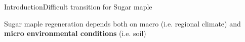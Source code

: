 \documentclass[table]{eecslides}
\begin{document}

\begin{frame}{Introduction}{Difficult transition for Sugar maple}

Sugar maple regeneration depends both on
macro (i.e. regional climate) and \textbf{micro environmental conditions} (i.e. soil)



\end{frame}
\end{document}
